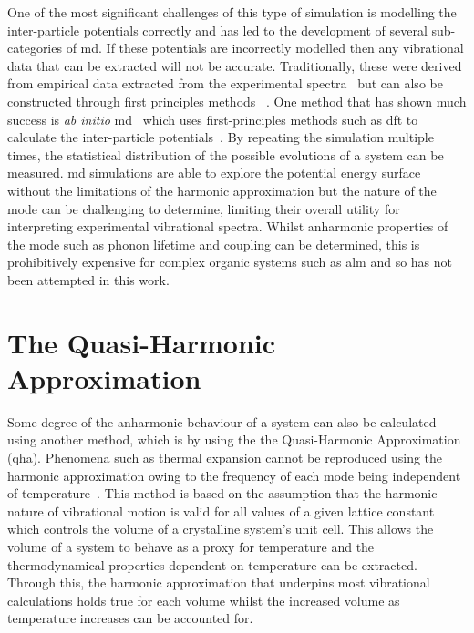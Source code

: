 One of the most significant challenges of this type of simulation is modelling the inter\nobreakdash-particle potentials correctly and has led to the development of several sub\nobreakdash-categories of \acrshort{md}. If these potentials are incorrectly modelled then any vibrational data that can be extracted will not be accurate. Traditionally, these were derived from empirical data extracted from the experimental spectra~\cite{Thakur1998, Haas1995, Miller2004} but can also be constructed through first principles methods ~\cite{Wang2020}. One method that has shown much success is \textit{ab initio} \acrshort{md}~\cite{Car2005} which uses first\nobreakdash-principles methods such as \acrshort{dft} to calculate the inter\nobreakdash-particle potentials~\cite{Gai1998}. By repeating the simulation multiple times, the statistical distribution of the possible evolutions of a system can be measured. \acrshort{md} simulations are able to explore the potential energy surface without the limitations of the harmonic approximation but the nature of the mode can be challenging to determine, limiting their overall utility for interpreting experimental vibrational spectra. Whilst anharmonic properties of the mode such as phonon lifetime and coupling can be determined, this is prohibitively expensive for complex organic systems such as \acrshort{alm} and so has not been attempted in this work.

\section{The Quasi-Harmonic Approximation}
 Some degree of the anharmonic behaviour of a system can also be calculated using another method, which is by using the the Quasi\nobreakdash-Harmonic Approximation (\acrshort{qha}). Phenomena such as thermal expansion cannot be reproduced using the harmonic approximation owing to the frequency of each mode being independent of temperature~\cite{yatsyshyn2015handbook}. This method is based on the assumption that the harmonic nature of vibrational motion is valid for all values of a given lattice constant which controls the volume of a crystalline system's unit cell. This allows the volume of a system to behave as a proxy for temperature and the thermodynamical properties dependent on temperature can be extracted. Through this, the harmonic approximation that underpins most vibrational calculations holds true for each volume whilst the increased volume as temperature increases can be accounted for. 

